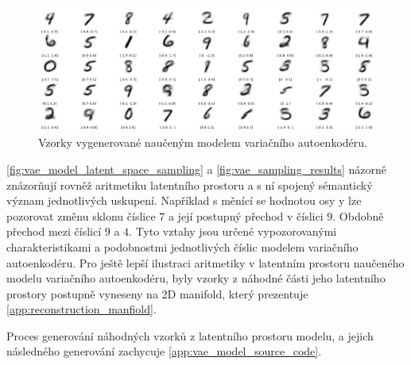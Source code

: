 \begin{figure}[H]
    \centering
    \includegraphics[width=\textwidth]{figures/vae_model_latent_space_sampling_results.png}
    \caption{Vzorky vygenerované naučeným modelem variačního autoenkodéru.}
    \label{fig:vae_sampling_results}
\end{figure}


\autoref{fig:vae_model_latent_space_sampling} a \autoref{fig:vae_sampling_results} názorně znázorňují rovněž aritmetiku latentního prostoru a s ní spojený sémantický význam jednotlivých uskupení.
Například s měnící se hodnotou osy y lze pozorovat změnu sklonu číslice $7$ a její postupný přechod v číslici $9$. Obdobně přechod mezi číslicí $9$ a $4$.
Tyto vztahy jsou určené vypozorovanými charakteristikami a podobnostmi jednotlivých číslic modelem variačního autoenkodéru.
Pro ještě lepší ilustraci aritmetiky v latentním prostoru naučeného modelu variačního autoenkodéru, byly vzorky z náhodné části jeho latentního prostory postupně vyneseny na 2D manifold, který prezentuje \autoref{app:reconstruction_manfiold}.

Proces generování náhodných vzorků z latentního prostoru modelu, a jejich následného generování zachycuje \autoref{app:vae_model_source_code}.